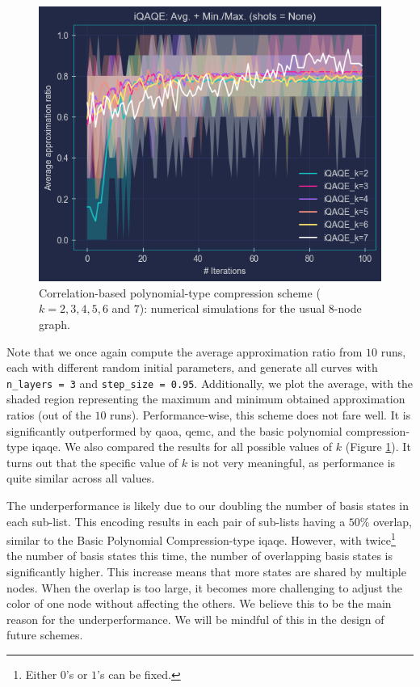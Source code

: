 \clearpage

\footnotetext[\value{footnote}]{This refers to the scenario where only $1$'s are fixed, not $0$'s.}

\begin{figure}[H]
  \centering
  \includegraphics[width=\textwidth]{Figures/Chapter_5/Correlation-based/All_k's.png}
  \caption{Correlation-based polynomial-type compression scheme ($k = 2, 3, 4, 5, 6$ and $7$): numerical simulations for the usual $8$-node graph.}
  \label{fig:All_k's}
\end{figure}

Note that we once again compute the average approximation ratio from $10$ runs, each with different random initial parameters, and generate all curves with \texttt{n\_layers = 3} and \texttt{step\_size = 0.95}. Additionally, we plot the average, with the shaded region representing the maximum and minimum obtained approximation ratios (out of the $10$ runs). Performance-wise, this scheme does not fare well. It is significantly outperformed by \acrshort{qaoa}, \acrshort{qemc}, and the basic polynomial compression-type \acrshort{iqaqe}. We also compared the results for all possible values of $k$ (Figure \ref{fig:All_k's}). It turns out that the specific value of $k$ is not very meaningful, as performance is quite similar across all values.

The underperformance is likely due to our doubling the number of basis states in each sub-list. This encoding results in each pair of sub-lists having a $50\%$ overlap, similar to the Basic Polynomial Compression-type \acrshort{iqaqe}. However, with twice\footnote{Either $0$'s or $1$'s can be fixed.} the number of basis states this time, the number of overlapping basis states is significantly higher. This increase means that more states are shared by multiple nodes. When the overlap is too large, it becomes more challenging to adjust the color of one node without affecting the others. We believe this to be the main reason for the underperformance. We will be mindful of this in the design of future schemes.

